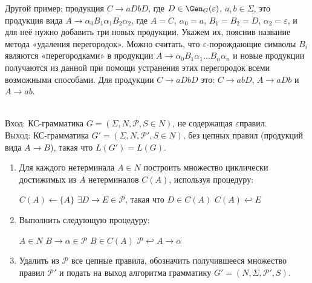 \begin{NumAlgo}
\begin{Remark}
Другой пример: продукция $C \to aDbD$, где $D \in \Gen_G(\varepsilon)$, $a, b \in
\Sigma$, это продукция вида $A \to \alpha_0 B_1 \alpha_1 B_2 \alpha_2$, где $A =
C$, $\alpha_0 = a$, $B_1 = B_2 = D$, $\alpha_2 = \varepsilon$, и для неё нужно
добавить три новых продукции. Укажем их, пояснив название метода «удаления
перегородок». Можно считать, что $\varepsilon$-порождающие символы $B_i$ являются
«перегородками» в продукции $A \to \alpha_0 B_1 \alpha_1 \ldots B_n \alpha_n$ и
новые продукции получаются из данной при помощи устранения этих перегородок всеми
возможными способами. Для продукции $C \to aDbD$ это: $C \to abD$, $A \to aDb$ и
$A \to ab$.
\end{Remark}
\end{NumAlgo}

\begin{NumAlgo}\label{algo-del-chains}
\nspace\\
\textsc{Вход}: КС-грамматика $G=(\Sigma, N, \mathcal P, S \in N)$, не
содержащая $\varepsilon$\nbdash{}правил.
\\ \textsc{Выход}: КС-грамматика
$G'=(\Sigma, N, \mathcal P', S \in N)$, без цепных правил (продукций вида $A \to B$), такая что $L(G')=L(G)$.
\begin{enumerate}
  \item Для каждого нетерминала $A \in N$ построить множество циклически
  достижимых из $A$ нетерминалов $C(A)$, используя процедуру:
  \begin{codebox}
  \li   $C(A) \gets \{ A \}$
  \li   \While $\exists D \to E \in \mathcal P$, такая что $D \in C(A)$
  \zi   \Do
        $C(A) \hookleftarrow E$
        \End
  \end{codebox}
  \item Выполнить следующую процедуру:
  \begin{codebox}
  \zi   \For $A \in N$
  \zi   \Do \For $B \to \alpha \in \mathcal P$
  \zi       \Do \If $B \in C(A)$
  \zi           \Then $\mathcal P \hookleftarrow A \to \alpha$
                \End
            \End
        \End
  \end{codebox}
  \item Удалить из $\mathcal P$ все цепные правила, обозначить
  получившееся множество правил $\mathcal P'$ и подать на выход алгоритма
  грамматику $G' = (N, \Sigma, \mathcal P', S)$.
\end{enumerate}
\end{NumAlgo}

